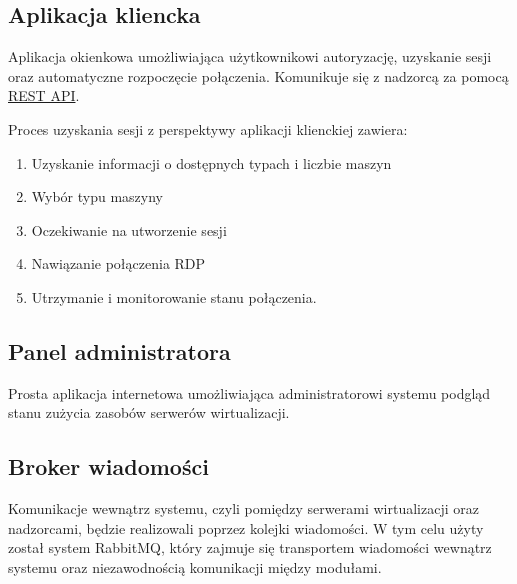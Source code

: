\documentclass[../opis-rozwiazania.tex]{subfiles}
\begin{document}
\subsection{Aplikacja kliencka}
\label{modules:client}

Aplikacja okienkowa umożliwiająca użytkownikowi autoryzację, uzyskanie sesji oraz automatyczne rozpoczęcie połączenia. Komunikuje się z nadzorcą za pomocą \hyperref[communication:api]{REST API}.

Proces uzyskania sesji z perspektywy aplikacji klienckiej zawiera:
\begin{enumerate}
    \item Uzyskanie informacji o dostępnych typach i liczbie maszyn
    \item Wybór typu maszyny
    \item Oczekiwanie na utworzenie sesji
    \item Nawiązanie połączenia RDP
    \item Utrzymanie i monitorowanie stanu połączenia.
\end{enumerate}

\subsection{Panel administratora}

Prosta aplikacja internetowa umożliwiająca administratorowi systemu podgląd stanu zużycia zasobów serwerów wirtualizacji.

\subsection{Broker wiadomości}
\label{modules:broker}

Komunikacje wewnątrz systemu, czyli pomiędzy serwerami wirtualizacji oraz nadzorcami, będzie realizowali poprzez kolejki wiadomości. W tym celu użyty został system RabbitMQ, który zajmuje się transportem wiadomości wewnątrz systemu oraz niezawodnością komunikacji między modułami.
\end{document}

